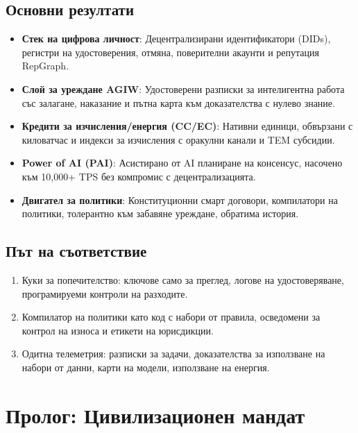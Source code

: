 \documentclass[11pt]{article}
\begin{document}
\subsection{Основни резултати}
\begin{itemize}[noitemsep]
  \item \textbf{Стек на цифрова личност}: Децентрализирани идентификатори (DIDs), регистри на удостоверения, отмяна, поверителни акаунти и репутация RepGraph.
  \item \textbf{Слой за уреждане AGIW}: Удостоверени разписки за интелигентна работа със залагане, наказание и пътна карта към доказателства с нулево знание.
  \item \textbf{Кредити за изчисления/енергия (CC/EC)}: Нативни единици, обвързани с киловатчас и индекси за изчисления с оракулни канали и TEM субсидии.
  \item \textbf{Power of AI (PAI)}: Асистирано от AI планиране на консенсус, насочено към 10,000+ TPS без компромис с децентрализацията.
  \item \textbf{Двигател за политики}: Конституционни смарт договори, компилатори на политики, толерантно към забавяне уреждане, обратима история.
\end{itemize}

\subsection{Път на съответствие}
\begin{enumerate}[noitemsep]
  \item Куки за попечителство: ключове само за преглед, логове на удостоверяване, програмируеми контроли на разходите.
  \item Компилатор на политики като код с набори от правила, осведомени за контрол на износа и етикети на юрисдикции.
  \item Одитна телеметрия: разписки за задачи, доказателства за използване на набори от данни, карти на модели, използване на енергия.
\end{enumerate}

\section{Пролог: Цивилизационен мандат}
\end{document}
